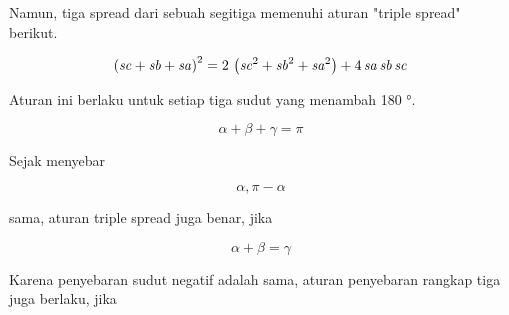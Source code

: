 \documentclass[a4paper,10pt]{article}
\begin{document}
\begin{eulernotebook}
\begin{eulercomment}
\begin{eulercomment}
\begin{eulercomment}
Namun, tiga spread dari sebuah segitiga memenuhi aturan "triple
spread" berikut.
\end{eulercomment}
\begin{eulerformula}
\[
\left({\it sc}+{\it sb}+{\it sa}\right)^2=2\,\left({\it sc}^2+
 {\it sb}^2+{\it sa}^2\right)+4\,{\it sa}\,{\it sb}\,{\it sc}
\]
\end{eulerformula}
\begin{eulercomment}
Aturan ini berlaku untuk setiap tiga sudut yang menambah 180 °.

\end{eulercomment}
\begin{eulerformula}
\[
\alpha+\beta+\gamma=\pi
\]
\end{eulerformula}
\begin{eulercomment}
Sejak menyebar

\end{eulercomment}
\begin{eulerformula}
\[
\alpha, \pi-\alpha
\]
\end{eulerformula}
\begin{eulercomment}
sama, aturan triple spread juga benar, jika

\end{eulercomment}
\begin{eulerformula}
\[
\alpha+\beta=\gamma
\]
\end{eulerformula}
\begin{eulercomment}
Karena penyebaran sudut negatif adalah sama, aturan penyebaran rangkap
tiga juga berlaku, jika


\end{eulercomment}
\end{eulercomment}
\end{eulercomment}
\end{eulernotebook}
\end{document}
